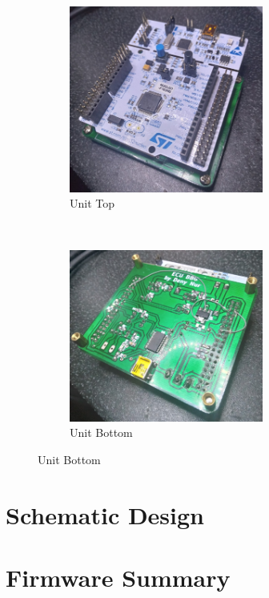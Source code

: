 \documentclass[a4paper,12pt,oneside,pdflatex,italian,final,twocolumn]{article}
\begin{document}
	\begin{figure}[h]
		\centering
		\begin{subfigure}[b]{0.32\textwidth}
			\includegraphics[width=0.7\textwidth]{images/unit_top.jpg}
			\caption{Unit Top}
		\end{subfigure}
		~
		\begin{subfigure}[b]{0.32\textwidth}
			\includegraphics[width=0.7\textwidth]{images/unit_bot.jpg}
			\caption{Unit Bottom}
		\end{subfigure}
	\end{figure}

	\section{Schematic Design}
	
	
	
	\newpage
	\section{Firmware Summary}
	
\end{document}
